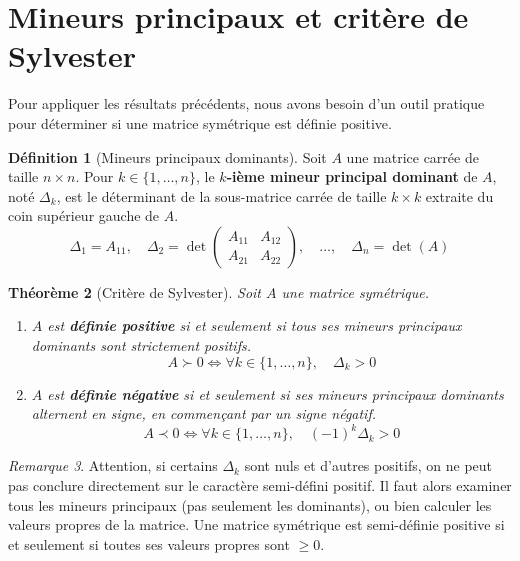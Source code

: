 \documentclass[a4paper,12pt,openany]{book}
\theoremstyle{plain}
\newtheorem{theorem}{Théorème}[section]
\theoremstyle{definition}
\newtheorem{definition}[theorem]{Définition}
\theoremstyle{remark}
\newtheorem{remark}[theorem]{Remarque}
\theoremstyle{nbstyle}
\begin{document}
	\section{Mineurs principaux et critère de Sylvester}
	
	Pour appliquer les résultats précédents, nous avons besoin d'un outil pratique pour déterminer si une matrice symétrique est définie positive.
	
	\begin{definition}[Mineurs principaux dominants]
		Soit $A$ une matrice carrée de taille $n \times n$. Pour $k \in \{1, \dots, n\}$, le \textbf{$k$-ième mineur principal dominant} de $A$, noté $\Delta_k$, est le déterminant de la sous-matrice carrée de taille $k \times k$ extraite du coin supérieur gauche de $A$.
		$$ \Delta_1 = A_{11}, \quad \Delta_2 = \det \begin{pmatrix} A_{11} & A_{12} \\ A_{21} & A_{22} \end{pmatrix}, \quad \dots, \quad \Delta_n = \det(A) $$
	\end{definition}
	
	\begin{theorem}[Critère de Sylvester]
		Soit $A$ une matrice symétrique.
		\begin{enumerate}
			\item $A$ est \textbf{définie positive} si et seulement si tous ses mineurs principaux dominants sont strictement positifs.
			$$ A \succ 0 \iff \forall k \in \{1, \dots, n\}, \quad \Delta_k > 0 $$
			\item $A$ est \textbf{définie négative} si et seulement si ses mineurs principaux dominants alternent en signe, en commençant par un signe négatif.
			$$ A \prec 0 \iff \forall k \in \{1, \dots, n\}, \quad (-1)^k \Delta_k > 0 $$
		\end{enumerate}
	\end{theorem}
	
	\begin{remark}
		Attention, si certains $\Delta_k$ sont nuls et d'autres positifs, on ne peut pas conclure directement sur le caractère semi-défini positif. Il faut alors examiner tous les mineurs principaux (pas seulement les dominants), ou bien calculer les valeurs propres de la matrice. Une matrice symétrique est semi-définie positive si et seulement si toutes ses valeurs propres sont $\ge 0$.
	\end{remark}
	
\end{document}
